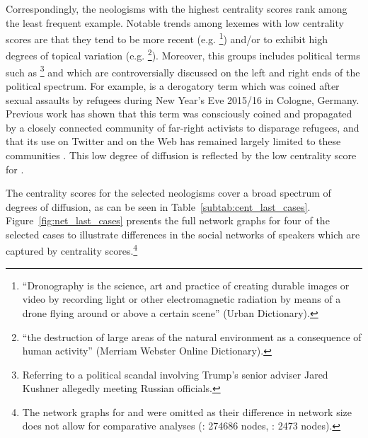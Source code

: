 \documentclass[
  a4paper,
  abstract=on,
  captions=tableabove
  ]{scrartcl}
\begin{document}
      Correspondingly, the neologisms with the highest centrality scores rank among the least frequent example. Notable trends among lexemes with low centrality scores are that they tend to be more recent (e.g. \footnote{\enquote{Dronography is the science, art and practice of creating durable images or video by recording light or other electromagnetic radiation by means of a drone flying around or above a certain scene} (Urban Dictionary).}) and/or to exhibit high degrees of topical variation (e.g. \footnote{\enquote{the destruction of large areas of the natural environment as a consequence of human activity} (Merriam Webster Online Dictionary).}). Moreover, this groups includes political terms such as \footnote{Referring to a political scandal involving Trump's senior adviser Jared Kushner allegedly meeting Russian officials.} and  which are controversially discussed on the left and right ends of the political spectrum. For example,  is a derogatory term which was coined after sexual assaults by refugees during New Year's Eve 2015/16 in Cologne, Germany. Previous work has shown that this term was consciously coined and propagated by a closely connected community of far-right activists to disparage refugees, and that its use on Twitter and on the Web has remained largely limited to these communities \parencite{Wurschinger2016UsingWeb}. This low degree of diffusion is reflected by the low centrality score for .

      The centrality scores for the selected neologisms cover a broad spectrum of degrees of diffusion, as can be seen in Table~\ref{subtab:cent_last_cases}. Figure~\ref{fig:net_last_cases} presents the full network graphs for four of the selected cases to illustrate differences in the social networks of speakers which are captured by centrality scores.\footnote{The network graphs for  and  were omitted as their difference in network size does not allow for comparative analyses (: \num{274686} nodes, : \num{2473} nodes).}  
\end{document}
